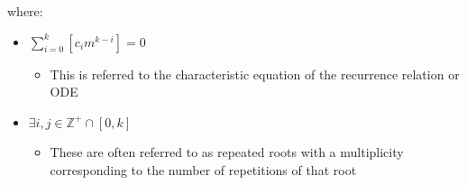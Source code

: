 \documentclass[11pt]{article}
\begin{document}
where:

\begin{itemize}
\item \(\sum^{k}_{i=0}\left[  c_{i}m^{k-i} \right] = 0\)
\begin{itemize}
\item This is referred to the characteristic equation of the recurrence relation or ODE \cite{levinSolvingRecurrenceRelations2018}
\end{itemize}
\item \(\exists i,j \in \mathbb{Z}^{+} \cap \left[0,k\right]\)
\begin{itemize}
\item These are often referred to as repeated roots \cite{levinSolvingRecurrenceRelations2018,zillMatrixExponential2009} with a multiplicity corresponding to the number of repetitions of that root \cite[]{nicodemiIntroductionAbstractAlgebra2007}
\end{itemize}
\end{itemize}
\end{document}
